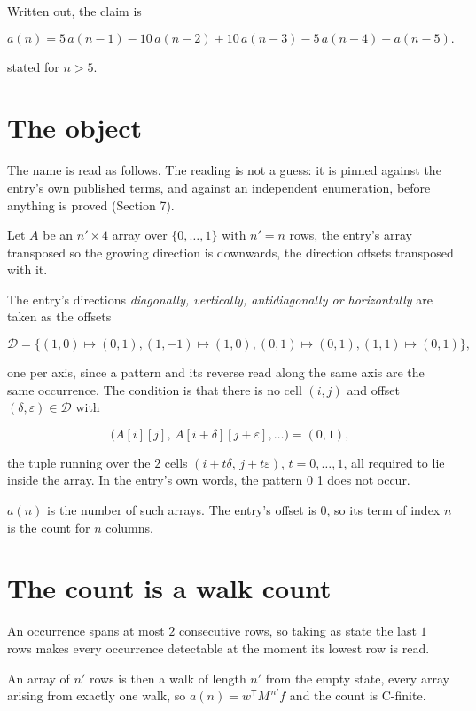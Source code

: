 \documentclass[11pt]{article}
\theoremstyle{definition}
\begin{document}
Written out, the claim is

\[a(n) = 5\,a(n-1) - 10\,a(n-2) + 10\,a(n-3) - 5\,a(n-4) + a(n-5).\]

stated for $n > 5$.

\section{The object}

The name is read as follows. The reading is not a guess: it is pinned against the entry's own published terms, and against an independent enumeration, before anything is proved (Section 7).

Let $A$ be an $n' \times 4$ array over $\{0,\dots,1\}$ with $n' = n$ rows, the entry's array transposed so the growing direction is downwards, the direction offsets transposed with it.

The entry's directions {\itshape diagonally, vertically, antidiagonally or horizontally} are taken as the offsets

\[\mathcal{D} = \{(1,0)\mapsto(0,1), (1,-1)\mapsto(1,0), (0,1)\mapsto(0,1), (1,1)\mapsto(0,1)\},\]

one per axis, since a pattern and its reverse read along the same axis are the same occurrence. The condition is that there is no cell $(i,j)$ and offset $(\delta,\varepsilon)\in\mathcal{D}$ with

\[\bigl(A[i][j],\,A[i{+}\delta][j{+}\varepsilon],\dots\bigr) = (0, 1),\]

the tuple running over the $2$ cells $(i+t\delta,\,j+t\varepsilon)$, $t = 0,\dots,1$, all required to lie inside the array. In the entry's own words, the pattern 0 1 does not occur.

$a(n)$ is the number of such arrays. The entry's offset is 0, so its term of index $n$ is the count for $n$ columns.

\section{The count is a walk count}

An occurrence spans at most $2$ consecutive rows, so taking as state the last $1$ rows makes every occurrence detectable at the moment its lowest row is read.

An array of $n'$ rows is then a walk of length $n'$ from the empty state, every array arising from exactly one walk, so $a(n) = w^{\mathsf T}M^{\,n'}f$ and the count is C-finite.
\end{document}
